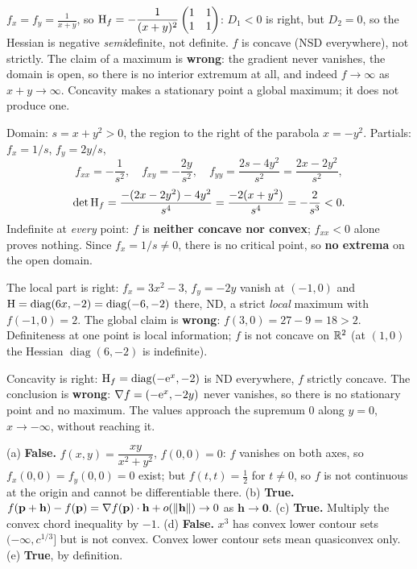 \begin{solutions}
  \item $f_x=f_y=\tfrac1{x+y}$, so
        $\operatorname{H}_f=-\dfrac{1}{(x+y)^{2}}\begin{pmatrix}1&1\\1&1\end{pmatrix}$:
        $D_1<0$ is right, but $D_2=0$, so the Hessian is negative
        \emph{semi}definite, not definite. $f$ is concave (NSD everywhere),
        not strictly. The claim of a maximum is \textbf{wrong}: the
        gradient never vanishes, the domain is open, so there is no
        interior extremum at all, and indeed $f\to\infty$ as $x+y\to\infty$.
        Concavity makes a stationary point a global maximum; it does not
        produce one.

  \item Domain: $s=x+y^{2}>0$, the region to the right of the parabola
        $x=-y^{2}$. Partials: $f_x=1/s$, $f_y=2y/s$,
        \[
          f_{xx}=-\frac{1}{s^{2}},\quad f_{xy}=-\frac{2y}{s^{2}},\quad
          f_{yy}=\frac{2s-4y^{2}}{s^{2}}=\frac{2x-2y^{2}}{s^{2}},
        \]
        \[
          \det\operatorname{H}_f=\frac{-(2x-2y^{2})-4y^{2}}{s^{4}}
          =\frac{-2(x+y^{2})}{s^{4}}=-\frac{2}{s^{3}}<0 .
        \]
        Indefinite at \emph{every} point: $f$ is \textbf{neither concave
        nor convex}; $f_{xx}<0$ alone proves nothing. Since $f_x=1/s\neq0$,
        there is no critical point, so \textbf{no extrema} on the open
        domain.

  \item The local part is right: $f_x=3x^{2}-3$, $f_y=-2y$ vanish at
        $(-1,0)$ and $\operatorname{H}=\operatorname{diag}(6x,-2)
        =\operatorname{diag}(-6,-2)$ there, ND, a strict \emph{local}
        maximum with $f(-1,0)=2$. The global claim is \textbf{wrong}:
        $f(3,0)=27-9=18>2$. Definiteness at one point is local
        information; $f$ is not concave on $\mathbb{R}^{2}$ (at $(1,0)$ the Hessian
        $\operatorname{diag}(6,-2)$ is indefinite).

  \item Concavity is right: $\operatorname{H}_f=\operatorname{diag}(-\mathrm{e}^{x},-2)$
        is ND everywhere, $f$ strictly concave. The conclusion is
        \textbf{wrong}: $\nabla f=(-\mathrm{e}^{x},-2y)$ never vanishes, so
        there is no stationary point and no maximum. The values approach
        the supremum $0$ along $y=0$, $x\to-\infty$, without reaching it.

  \item (a) \textbf{False.} $f(x,y)=\dfrac{xy}{x^{2}+y^{2}}$, $f(0,0)=0$:
        $f$ vanishes on both axes, so $f_x(0,0)=f_y(0,0)=0$ exist; but
        $f(t,t)=\tfrac12$ for $t\neq0$, so $f$ is not continuous at the
        origin and cannot be differentiable there.
        (b) \textbf{True.}
        $f(\mathbf{p}+\mathbf{h})-f(\mathbf{p})
        =\nabla f(\mathbf{p})\cdot\mathbf{h}+o(\|\mathbf{h}\|)\to0$ as
        $\mathbf{h}\to\mathbf{0}$.
        (c) \textbf{True.} Multiply the convex chord inequality by $-1$.
        (d) \textbf{False.} $x^{3}$ has convex lower contour sets
        $(-\infty,c^{1/3}]$ but is not convex. Convex lower contour sets
        mean quasiconvex only.
        (e) \textbf{True}, by definition.


\end{solutions}
